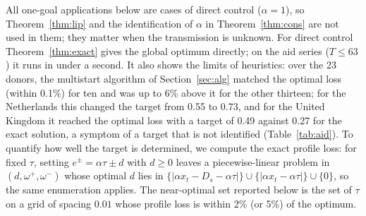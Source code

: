 \documentclass[pdflatex,sn-basic]{sn-jnl}
\theoremstyle{thmstyleone}\newtheorem{proposition}{Proposition}\newtheorem{theorem}{Theorem}
\theoremstyle{thmstylethree}\newtheorem{remark}{Remark}
\begin{document}
All one-goal applications below are cases of direct control ($\alpha=1$), so Theorem~\ref{thm:lip} and the identification of $\alpha$ in Theorem~\ref{thm:cons} are not used in them; they matter when the transmission is unknown. For direct control Theorem~\ref{thm:exact} gives the global optimum directly; on the aid series ($T\le63$) it runs in under a second. It also shows the limits of heuristics: over the 23 donors, the multistart algorithm of Section~\ref{sec:alg} matched the optimal loss (within 0.1\%) for ten and was up to 6\% above it for the other thirteen; for the Netherlands this changed the target from 0.55 to 0.73, and for the United Kingdom it reached the optimal loss with a target of 0.49 against 0.27 for the exact solution, a symptom of a target that is not identified (Table~\ref{tab:aid}). To quantify how well the target is determined, we compute the exact profile loss: for fixed $\tau$, setting $e^\pm=\alpha\tau\pm d$ with $d\ge0$ leaves a piecewise-linear problem in $(d,\omega^+,\omega^-)$ whose optimal $d$ lies in $\{|\alpha x_t-D_s-\alpha\tau|\}\cup\{|\alpha x_t-\alpha\tau|\}\cup\{0\}$, so the same enumeration applies. The near-optimal set reported below is the set of $\tau$ on a grid of spacing $0.01$ whose profile loss is within 2\% (or 5\%) of the optimum.
\end{document}
